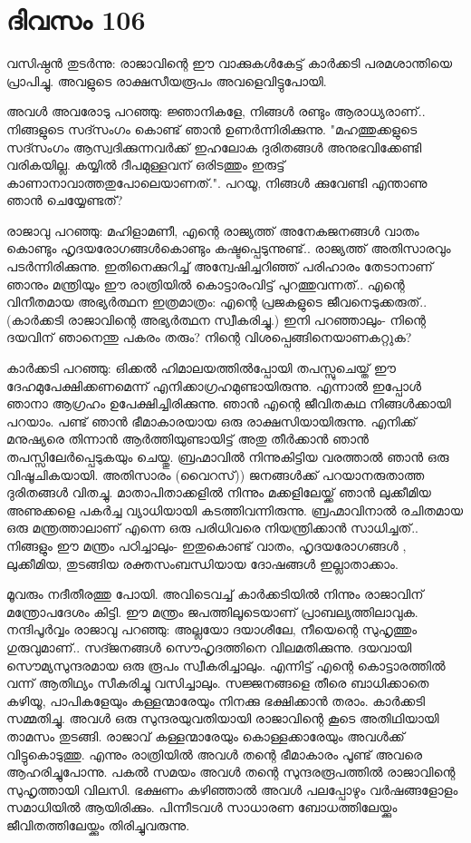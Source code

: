 \newpage
\section{ദിവസം 106}


വസിഷ്ഠന്‍ തുടര്‍ന്നു: രാജാവിന്റെ ഈ വാക്കുകള്‍കേട്ട്‌ കാര്‍ക്കടി പരമശാന്തിയെ പ്രാപിച്ചു. അവളുടെ രാക്ഷസീയരൂപം അവളെവിട്ടുപോയി.

അവള്‍ അവരോടു പറഞ്ഞു: ജ്ഞാനികളേ, നിങ്ങള്‍ രണ്ടും ആരാധ്യരാണ്‌.. നിങ്ങളുടെ സദ്സംഗം കൊണ്ട്‌ ഞാന്‍ ഉണര്‍ന്നിരിക്കുന്നു. "മഹത്തുക്കളുടെ സദ്സംഗം ആസ്വദിക്കുന്നവര്‍ക്ക്‌ ഇഹലോക ദുരിതങ്ങള്‍ അനുഭവിക്കേണ്ടി വരികയില്ല. കയ്യില്‍ ദീപമുള്ളവന്‌ ഒരിടത്തും ഇരുട്ട്‌ കാണാനാവാത്തതുപോലെയാണത്‌.". പറയൂ, നിങ്ങള്‍ ക്കുവേണ്ടി എന്താണു ഞാന്‍ ചെയ്യേണ്ടത്‌?

രാജാവു പറഞ്ഞു: മഹിളാമണീ, എന്റെ രാജ്യത്ത്‌ അനേകജനങ്ങള്‍ വാതം കൊണ്ടും ഹൃദയരോഗങ്ങള്‍കൊണ്ടും കഷ്ടപ്പെടുന്നുണ്ട്‌.. രാജ്യത്ത്‌ അതിസാരവും പടര്‍ന്നിരിക്കുന്നു. ഇതിനെക്കുറിച്ച്‌ അന്വേഷിച്ചറിഞ്ഞ്‌ പരിഹാരം തേടാനാണ്‌ ഞാനും മന്ത്രിയും ഈ രാത്രിയില്‍ കൊട്ടാരംവിട്ട്‌ പുറത്തുവന്നത്‌.. എന്റെ വിനീതമായ അഭ്യര്‍ത്ഥന ഇത്രമാത്രം: എന്റെ പ്രജകളുടെ ജീവനെടുക്കരുത്‌.. (കാര്‍ക്കടി രാജാവിന്റെ അഭ്യര്‍ത്ഥന സ്വീകരിച്ചു.) ഇനി പറഞ്ഞാലും- നിന്റെ ദയവിന്‌ ഞാനെന്തു പകരം തരും? നിന്റെ വിശപ്പെങ്ങിനെയാണകറ്റുക?

കാര്‍ക്കടി പറഞ്ഞു: ഒിക്കല്‍ ഹിമാലയത്തില്‍പ്പോയി തപസ്സുചെയ്ത്‌ ഈ ദേഹമുപേക്ഷിക്കണമെന്ന് എനിക്കാഗ്രഹമുണ്ടായിരുന്നു. എന്നാല്‍ ഇപ്പോള്‍ ഞാനാ ആഗ്രഹം ഉപേക്ഷിച്ചിരിക്കുന്നു. ഞാന്‍ എന്റെ ജീവിതകഥ നിങ്ങള്‍ക്കായി പറയാം. പണ്ട്‌ ഞാന്‍ ഭീമാകാരയായ ഒരു രാക്ഷസിയായിരുന്നു. എനിക്ക്‌ മനുഷ്യരെ തിന്നാന്‍ ആര്‍ത്തിയുണ്ടായിട്ട്‌ അതു തീര്‍ക്കാന്‍ ഞാന്‍ തപസ്സിലേര്‍പ്പെടുകയും ചെയ്തു. ബ്രഹ്മാവില്‍ നിന്നുകിട്ടിയ വരത്താല്‍ ഞാന്‍ ഒരു വിഷൂചികയായി. അതിസാരം (വൈറസ്‌)) ജനങ്ങള്‍ക്ക്‌ പറയാനരുതാത്ത ദുരിതങ്ങള്‍ വിതച്ചു. മാതാപിതാക്കളില്‍ നിന്നും മക്കളിലേയ്ക്ക്‌ ഞാന്‍ ലുക്കീമിയ അണുക്കളെ പകര്‍ച്ച വ്യാധിയായി കടത്തിവന്നിരുന്നു. ബ്രഹ്മാവിനാല്‍ രചിതമായ ഒരു മന്ത്രത്താലാണ്‌ എന്നെ ഒരു പരിധിവരെ നിയന്ത്രിക്കാന്‍ സാധിച്ചത്‌.. നിങ്ങളും ഈ മന്ത്രം പഠിച്ചാലും- ഇതുകൊണ്ട്‌ വാതം, ഹൃദയരോഗങ്ങള്‍ , ലുക്കീമിയ, തുടങ്ങിയ രക്തസംബന്ധിയായ ദോഷങ്ങള്‍ ഇല്ലാതാക്കാം.

മൂവരും നദീതീരത്തു പോയി. അവിടെവച്ച്‌ കാര്‍ക്കടിയില്‍ നിന്നും രാജാവിന്‌ മന്ത്രോപദേശം കിട്ടി. ഈ മന്ത്രം ജപത്തിലൂടെയാണ്‌ പ്രാബല്യത്തിലാവുക. നന്ദിപൂര്‍വ്വം രാജാവു പറഞ്ഞു: അല്ലയോ ദയാശീലേ, നീയെന്റെ സുഹൃത്തും ഗുരുവുമാണ്‌.. സദ്ജനങ്ങള്‍ സൌഹൃദത്തിനെ വിലമതിക്കുന്നു. ദയവായി സൌമ്യസുന്ദരമായ ഒരു രൂപം സ്വീകരിച്ചാലും. എന്നിട്ട്‌ എന്റെ കൊട്ടാരത്തില്‍ വന്ന് ആതിഥ്യം സീകരിച്ചു വസിച്ചാലും. സജ്ജനങ്ങളെ തീരെ ബാധിക്കാതെ കഴിയൂ, പാപികളേയും കള്ളന്മാരേയും നിനക്കു ഭക്ഷിക്കാന്‍ തരാം. കാര്‍ക്കടി സമ്മതിച്ചു. അവള്‍ ഒരു സുന്ദരയുവതിയായി രാജാവിന്റെ കൂടെ അതിഥിയായി താമസം തുടങ്ങി. രാജാവ്‌ കള്ളന്മാരേയും കൊള്ളക്കാരേയും അവള്‍ക്ക്‌ വിട്ടുകൊടുത്തു. എന്നും രാത്രിയില്‍ അവള്‍ തന്റെ ഭീമാകാരം പൂണ്ട്‌ അവരെ ആഹരിച്ചുപോന്നു. പകല്‍ സമയം അവള്‍ തന്റെ സുന്ദരരൂപത്തില്‍ രാജാവിന്റെ സുഹൃത്തായി വിലസി. ഭക്ഷണം കഴിഞ്ഞാല്‍ അവള്‍ പലപ്പോഴും വര്‍ഷങ്ങളോളം സമാധിയില്‍ ആയിരിക്കും. പിന്നീടവള്‍ സാധാരണ ബോധത്തിലേയ്ക്കും ജീവിതത്തിലേയ്ക്കും തിരിച്ചുവരുന്നു. 

